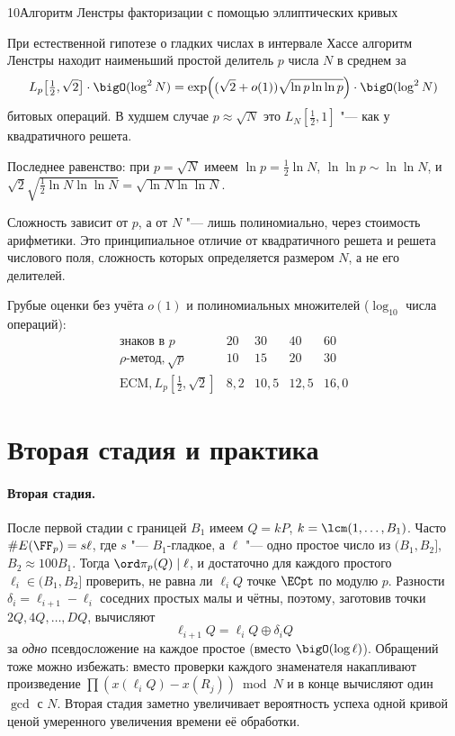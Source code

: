 \begin{lecture}{10}{Алгоритм Ленстры факторизации с помощью эллиптических кривых}
\begin{theorem}\label{l10:complexity}
При естественной гипотезе о гладких числах в интервале Хассе алгоритм Ленстры находит
наименьший простой делитель $p$ числа $N$ в среднем за
\[
  L_p\bigl[\tfrac12, \sqrt 2\bigr] \cdot \bigO(\log^2 N)
  = \exp\Bigl((\sqrt 2 + o(1))\sqrt{\ln p \ln\ln p}\Bigr) \cdot \bigO(\log^2 N)
\]
битовых операций. В худшем случае $p \approx \sqrt N$ это $L_N[\frac12, 1]$ "--- как у
квадратичного решета.
\end{theorem}

Последнее равенство: при $p = \sqrt N$ имеем $\ln p = \frac12 \ln N$, $\ln\ln p \sim \ln\ln N$,
и $\sqrt 2 \sqrt{\frac12 \ln N \ln\ln N} = \sqrt{\ln N \ln\ln N}$.

\begin{remark}
Сложность зависит от $p$, а от $N$ "--- лишь полиномиально, через стоимость арифметики. Это
принципиальное отличие от квадратичного решета и решета числового поля, сложность которых
определяется размером $N$, а не его делителей.
\end{remark}

Грубые оценки без учёта $o(1)$ и полиномиальных множителей ($\log_{10}$ числа операций):
\[
\begin{array}{r|cccc}
  \text{знаков в } p & 20 & 30 & 40 & 60 \\ \hline
  \rho\text{-метод}, \sqrt p & 10 & 15 & 20 & 30 \\
  \text{ECM}, L_p[\frac12, \sqrt 2] & 8{,}2 & 10{,}5 & 12{,}5 & 16{,}0
\end{array}
\]


\section{Вторая стадия и практика}

\paragraph{Вторая стадия.}
После первой стадии с границей $B_1$ имеем $Q = kP$, $k = \lcm(1, \dots, B_1)$. Часто
$\#E(\FF_p) = s\ell$, где $s$ "--- $B_1$-гладкое, а $\ell$ "--- одно простое число из
$(B_1, B_2]$, $B_2 \approx 100 B_1$. Тогда $\ord \pi_p(Q) \mid \ell$, и достаточно для каждого
простого $\ell_i \in (B_1, B_2]$ проверить, не равна ли $\ell_i Q$ точке $\ECpt$ по модулю $p$.
Разности $\delta_i = \ell_{i+1} - \ell_i$ соседних простых малы и чётны, поэтому, заготовив
точки $2Q, 4Q, \dots, DQ$, вычисляют
\[
  \ell_{i+1} Q = \ell_i Q \oplus \delta_i Q
\]
за \emph{одно} псевдосложение на каждое простое (вместо $\bigO(\log \ell)$). Обращений тоже можно
избежать: вместо проверки каждого знаменателя накапливают произведение $\prod (x(\ell_i Q) -
x(R_j)) \bmod N$ и в конце вычисляют один $\gcd$ с $N$. Вторая стадия заметно увеличивает вероятность
успеха одной кривой ценой умеренного увеличения времени её обработки.


\end{lecture}
